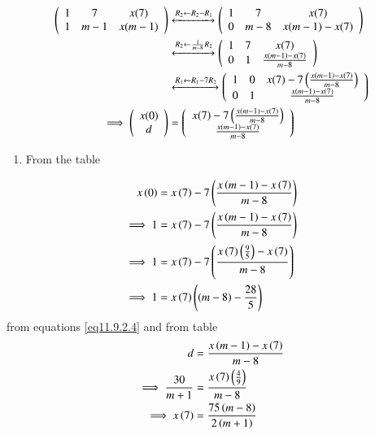 \documentclass[journal,12pt,onecolumn]{IEEEtran}
\theoremstyle{remark}
\begin{document}
\begin{align}
\left(
\begin{array}{ccc}
1 & 7 & x(7) \\
1 & m-1 & x(m-1)
\end{array}
\right)
&\xleftrightarrow[]{R_2 \leftarrow R_2-R_1}
\left(
\begin{array}{ccc}
1 & 7 & x(7) \\
0 & m-8 & x(m-1)-x(7)
\end{array}
\right)
\\
&\xleftrightarrow[]{R_2 \leftarrow \frac{1}{m-8}R_2}
\left(
\begin{array}{ccc}
1 & 7 & x(7) \\
0 & 1 & \frac{x(m-1)-x(7)}{m-8}
\end{array}
\right)
\\
&\xleftrightarrow[]{R_1 \leftarrow R_1-7R_2}
\left(
\begin{array}{ccc}
1 & 0 & x(7)-7\left(\frac{x(m-1)-x(7)}{m-8}\right) \\
0 & 1 & \frac{x(m-1)-x(7)}{m-8}
\end{array}
\right)
\\
\implies \left(
\begin{array}{c}
x(0) \\
d
\end{array}
\right)
&=
\left(
\begin{array}{c}
x(7)-7\left(\frac{x(m-1)-x(7)}{m-8}\right) \\
\frac{x(m-1)-x(7)}{m-8}
\end{array}
\right)
\end{align}
\begin{enumerate}
    \item From the table\\
\end{enumerate}
\begin{align}
    x\left(0\right)&=x\left(7\right)-7\left(\frac{x\left(m-1\right)-x\left(7\right)}{m-8}\right)\\
    \implies1&=x\left(7\right)-7\left(\frac{x\left(m-1\right)-x\left(7\right)}{m-8}\right)\\
    \implies1&=x\left(7\right)-7\left(\frac{x\left(7\right)\left(\frac{9}{5}\right)-x\left(7\right)}{m-8}\right)\\
    \implies1&=x\left(7\right)\left(\left(m-8\right)-\frac{28}{5}\right) \label{eq11.9.2.14}
\end{align}
from equations \eqref{eq11.9.2.4} and from table\\
 \begin{align}
    d&=\frac{x\left(m-1\right)-x\left(7\right)}{m-8}\\
    \implies\frac{30}{m+1}&=\frac{x\left(7\right)\left(\frac{4}{9}\right)}{m-8}\\ \label{eq11.9.2.17}
    \implies x\left(7\right)&=\frac{75\left(m-8\right)}{2\left(m+1\right)}
 \end{align}
\end{document}
